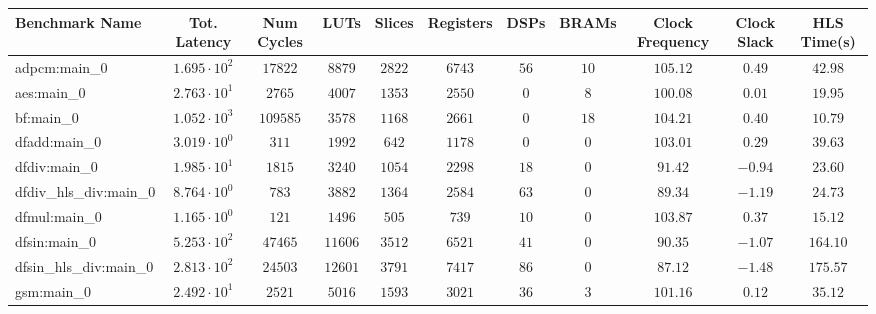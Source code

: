 \begin{tabular}{|l|c|c|c|c|c|c|c|c|c|c|}
\hline
Benchmark Name          & Tot. Latency           & Num Cycles & LUTs      & Slices    & Registers & DSPs    & BRAMs   & Clock Frequency & Clock Slack & HLS Time(s) \\
\hline
adpcm:main\_0           & $ 1.695 \cdot 10^{2} $ & $ 17822  $ & $ 8879  $ & $ 2822  $ & $ 6743  $ & $ 56  $ & $ 10  $ & $ 105.12      $ & $ 0.49    $ & $ 42.98   $ \\
aes:main\_0             & $ 2.763 \cdot 10^{1} $ & $ 2765   $ & $ 4007  $ & $ 1353  $ & $ 2550  $ & $ 0   $ & $ 8   $ & $ 100.08      $ & $ 0.01    $ & $ 19.95   $ \\
bf:main\_0              & $ 1.052 \cdot 10^{3} $ & $ 109585 $ & $ 3578  $ & $ 1168  $ & $ 2661  $ & $ 0   $ & $ 18  $ & $ 104.21      $ & $ 0.40    $ & $ 10.79   $ \\
dfadd:main\_0           & $ 3.019 \cdot 10^{0} $ & $ 311    $ & $ 1992  $ & $ 642   $ & $ 1178  $ & $ 0   $ & $ 0   $ & $ 103.01      $ & $ 0.29    $ & $ 39.63   $ \\
dfdiv:main\_0           & $ 1.985 \cdot 10^{1} $ & $ 1815   $ & $ 3240  $ & $ 1054  $ & $ 2298  $ & $ 18  $ & $ 0   $ & $ 91.42       $ & $ -0.94   $ & $ 23.60   $ \\
dfdiv\_hls\_div:main\_0 & $ 8.764 \cdot 10^{0} $ & $ 783    $ & $ 3882  $ & $ 1364  $ & $ 2584  $ & $ 63  $ & $ 0   $ & $ 89.34       $ & $ -1.19   $ & $ 24.73   $ \\
dfmul:main\_0           & $ 1.165 \cdot 10^{0} $ & $ 121    $ & $ 1496  $ & $ 505   $ & $ 739   $ & $ 10  $ & $ 0   $ & $ 103.87      $ & $ 0.37    $ & $ 15.12   $ \\
dfsin:main\_0           & $ 5.253 \cdot 10^{2} $ & $ 47465  $ & $ 11606 $ & $ 3512  $ & $ 6521  $ & $ 41  $ & $ 0   $ & $ 90.35       $ & $ -1.07   $ & $ 164.10  $ \\
dfsin\_hls\_div:main\_0 & $ 2.813 \cdot 10^{2} $ & $ 24503  $ & $ 12601 $ & $ 3791  $ & $ 7417  $ & $ 86  $ & $ 0   $ & $ 87.12       $ & $ -1.48   $ & $ 175.57  $ \\
gsm:main\_0             & $ 2.492 \cdot 10^{1} $ & $ 2521   $ & $ 5016  $ & $ 1593  $ & $ 3021  $ & $ 36  $ & $ 3   $ & $ 101.16      $ & $ 0.12    $ & $ 35.12   $ \\

\end{tabular}
